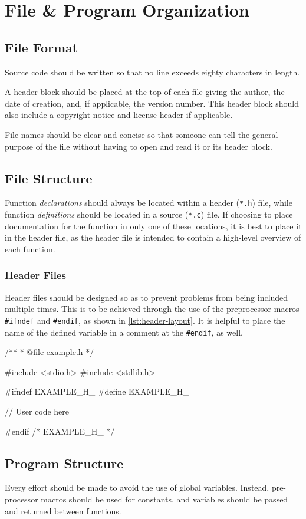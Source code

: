 \documentclass[StyleGuide.tex]{subfiles}
\begin{document}
\chapter{File \& Program Organization}\label{ch:file-program-organization}

\section{File Format}\label{sec:file-format}

Source code should be written so that no line exceeds eighty characters
in length.

A header block should be placed at the top of each file giving the
author, the date of creation, and, if applicable, the version number.
This header block should also include a copyright notice and license
header if applicable.

File names should be clear and concise so that someone can tell the
general purpose of the file without having to open and read it or its
header block.

\section{File Structure}\label{sec:file-structure}

Function \emph{declarations} should always be located within a header
(\texttt{*.h}) file, while function \emph{definitions} should be located
in a source (\texttt{*.c}) file. If choosing to place documentation for
the function in only one of these locations, it is best to place it in
the header file, as the header file is intended to contain a high-level
overview of each function.

\subsection{Header Files}\label{subsec:header-files}

Header files should be designed so as to prevent problems from being included
multiple times. This is to be achieved through the use of the preprocessor macros
\texttt{\#ifndef} and \texttt{\#endif}, as shown in \autoref{lst:header-layout}.
It is helpful to place the name of the defined variable in a comment at the
\texttt{\#endif}, as well.

\begin{code}[caption=Example of header file layout.,label=lst:header-layout]
/**
 * @file example.h
 */
 
#include <stdio.h>
#include <stdlib.h>

#ifndef EXAMPLE_H_
#define EXAMPLE_H_

// User code here

#endif /* EXAMPLE_H_ */
\end{code}

\section{Program Structure}\label{sec:program-structure}

Every effort should be made to avoid the use of global variables.
Instead, pre-processor macros should be used for constants, and
variables should be passed and returned between functions.
\end{document}
